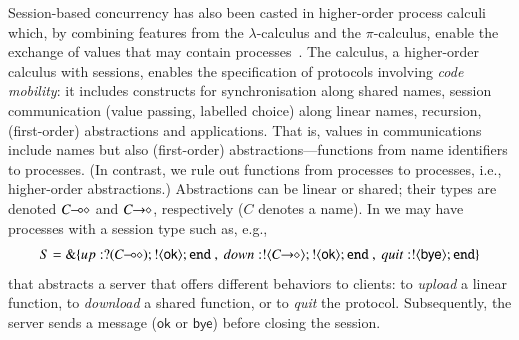 Session-based concurrency has also been casted in {higher-order} process
calculi which, by combining features from the $\lambda$-calculus and the $\pi$-calculus, 
enable the exchange of values 
that may contain processes~\cite{tlca07,DBLP:journals/jfp/GayV10}. 
The \HOp calculus, 
a higher-order calculus with sessions,
enables 
the specification of protocols involving \emph{code mobility}: it includes
constructs for 
synchronisation along shared names, 
session communication (value passing, labelled choice) along linear names,
recursion, 
 (first-order) abstractions 
 and applications.
 That is, 
 values in communications include names but also (first-order) abstractions---functions from name identifiers to processes. 
 (In contrast, we rule out functions from processes to processes, i.e., higher-order abstractions.)
Abstractions can be linear or shared; their types are  denoted $C\!\! \multimap\!\! \diamond$ and $C\!\! \rightarrow\!\! \diamond$, respectively ($C$ 
denotes a name). In \HOp we may have processes with a 
session type such as, e.g.,
$$S = \btbra{up:\btinp{\lhot{C}}\btout{\mathsf{ok}}\tinact ~ , ~ down:\btout{\shot{C}}\btout{\mathsf{ok}}\tinact ~ , ~quit:\btout{\mathsf{bye}}\tinact}_{}$$
that abstracts a server that offers different behaviors to clients: 
  to \emph{upload} a linear function, %
  to \emph{download} a shared function, %
   or to \emph{quit} the protocol. Subsequently, 
  the server sends a message ($\mathsf{ok}$ or $\mathsf{bye}$) before closing the session.


